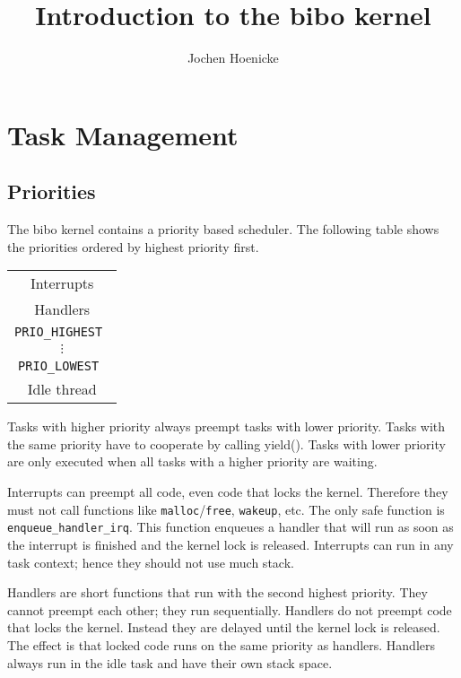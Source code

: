 \documentclass[twocolumn]{article}
\begin{document}
  \title{Introduction to the bibo kernel}
  \author{Jochen Hoenicke}
  \maketitle

  \tableofcontents

  \section{Task Management}

  \subsection{Priorities}
  
  The bibo kernel contains a priority based scheduler.  The following
  table shows the priorities ordered by highest priority first.
  
  \begin{center}
    \begin{tabular}{|c|}
      \hline
      Interrupts \\
      Handlers \\
      \hline
      \tt PRIO\_HIGHEST \\
      $\vdots$ \\
      \tt PRIO\_LOWEST \\
      \hline
      Idle thread\\
      \hline
    \end{tabular}
  \end{center}

  Tasks with higher priority always preempt tasks with lower priority.
  Tasks with the same priority have to cooperate by calling yield().  Tasks
  with lower priority are only executed when all tasks with a higher priority
  are waiting.
  
  Interrupts can preempt all code, even code that locks the kernel.  Therefore
  they must not call functions like \verb|malloc|/\verb|free|, \verb|wakeup|,
  etc.  The only safe function is \verb|enqueue_handler_irq|.  This function
  enqueues a handler that will run as soon as the interrupt is finished and
  the kernel lock is released.  Interrupts can run in any task context; hence
  they should not use much stack.
  
  Handlers are short functions that run with the second highest priority.
  They cannot preempt each other; they run sequentially.  Handlers do
  not preempt code that locks the kernel.  Instead they are delayed until the
  kernel lock is released.  The effect is that locked code runs on the same
  priority as handlers.  Handlers always run in the idle task and have their
  own stack space.
\end{document}
